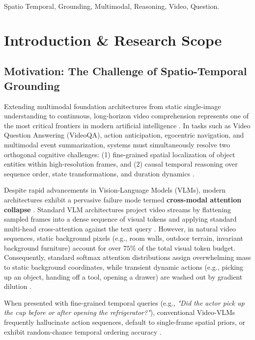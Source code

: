 \documentclass[10pt,journal,compsoc,twocolumn]{IEEEtran}
\begin{document}
\begin{IEEEkeywords}
Spatio Temporal, Grounding, Multimodal, Reasoning, Video, Question.
\end{IEEEkeywords}






\section{Introduction \& Research Scope}



\subsection{Motivation: The Challenge of Spatio-Temporal Grounding}


Extending multimodal foundation architectures from static single-image understanding to continuous, long-horizon video comprehension represents one of the most critical frontiers in modern artificial intelligence \cite{arxiv_2010_11146,arxiv_2005_14165}. In tasks such as Video Question Answering (VideoQA), action anticipation, egocentric navigation, and multimodal event summarization, systems must simultaneously resolve two orthogonal cognitive challenges: (1) fine-grained spatial localization of object entities within high-resolution frames, and (2) causal temporal reasoning over sequence order, state transformations, and duration dynamics \cite{arxiv_2203_02155,arxiv_2312_03893}.

Despite rapid advancements in Vision-Language Models (VLMs), modern architectures exhibit a pervasive failure mode termed \textbf{cross-modal attention collapse} \cite{arxiv_2406_00584}. Standard VLM architectures project video streams by flattening sampled frames into a dense sequence of visual tokens and applying standard multi-head cross-attention against the text query \cite{arxiv_2305_18290}. However, in natural video sequences, static background pixels (e.g., room walls, outdoor terrain, invariant background furniture) account for over $75\%$ of the total visual token budget. Consequently, standard softmax attention distributions assign overwhelming mass to static background coordinates, while transient dynamic actions (e.g., picking up an object, handing off a tool, opening a drawer) are washed out by gradient dilution \cite{arxiv_2501_02497}.

When presented with fine-grained temporal queries (e.g., \textit{"Did the actor pick up the cup before or after opening the refrigerator?"}), conventional Video-VLMs frequently hallucinate action sequences, default to single-frame spatial priors, or exhibit random-chance temporal ordering accuracy \cite{arxiv_2405_01543,crossref_10_1016_j_aei_2026_104392}.
\end{document}
